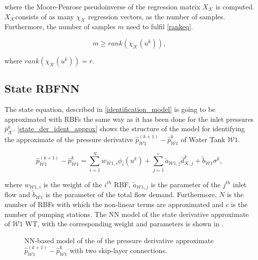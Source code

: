 where the Moore-Penrose pseudoinverse of the regression matrix $X_{\mathcal{K}}$ is computed. $X_{\mathcal{K}}$consists of as many $\chi_{\mathcal{K}}$ regression vectors, as the number of samples. Furthermore, the number of samples $m$ need to fulfil \eqref{rankeq}.

\begin{equation}
\label{rankeq}
 m \geq rank(\chi_{\mathcal{K}}(u^k)),
\end{equation}

\vspace{-3mm}

where $rank(\chi_{\mathcal{K}}(u^k)) = r$. 

 \subsection{State RBFNN}
\label{state_rbfnn}

The state equation, described in \eqref{identification_model} is going to be approximated with RBFs the same way as it has been done for the inlet pressures $\bar{p}^{k}_{\mathcal{K}}$. \eqref{state_der_ident_approx} shows the structure of the model for identifying the approximate of the pressure derivative $\hat{p}^{(k+1)}_{\mathcal{W}1} \!-\! \hat{p}^{k}_{\mathcal{W}1}$ of Water Tank $\mathcal{W}1$.

\vspace{-2mm}

\begin{equation}
\label{state_der_ident_approx}
\hat{p}^{(k+1)}_{\mathcal{W}1} \!-\! \hat{p}^{k}_{\mathcal{W}1} = \sum_{i = 1}^N w_{\mathcal{W}1,i} \phi_i(u^{k}) + \sum_{j = 1}^c \tilde{a}_{\mathcal{W}1,j} \bar{d}^{k}_{\mathcal{K},j} + \tilde{b}_{\mathcal{W}1} \sigma^{k},
\end{equation}

where $w_{\mathcal{W}1,i}$ is the weight of the $i^{th}$ RBF, $\tilde{a}_{\mathcal{W}1,j}$ is the parameter of the $j^{th}$ inlet flow and $\tilde{b}_{\mathcal{W}1}$ is the parameter of the total flow demand. Furthermore, $N$ is the number of RBFs with which the non-linear terms are approximated and $c$ is the number of pumping stations. The NN model of the state derivative approximate of $\mathcal{W}1$ WT, with the corresponding weight and parameters is shown in .

 \begin{figure}[H]
 \centering
 \hspace*{1.7cm} 
  \vspace{-3mm}
  \caption{NN-based model of the of the pressure derivative approximate $\hat{p}^{(k+1)}_{\mathcal{W}1} \!-\! \hat{p}^{k}_{\mathcal{W}1}$ with two skip-layer connections.}
 \label{fig:nn_state}
 \end{figure}

